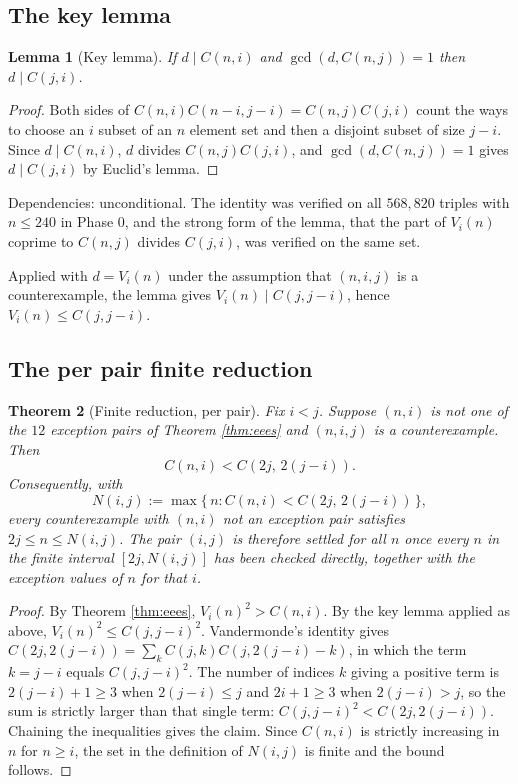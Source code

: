 \documentclass[11pt]{article}
\newtheorem{theorem}{Theorem}[section]
\newtheorem{lemma}[theorem]{Lemma}
\theoremstyle{remark}
\begin{document}
\subsection{The key lemma}

\begin{lemma}[Key lemma]
\label{lem:key}
If $d\mid C(n,i)$ and $\gcd(d,C(n,j))=1$ then $d\mid C(j,i)$.
\end{lemma}

\begin{proof}
Both sides of $C(n,i)C(n-i,j-i)=C(n,j)C(j,i)$ count the ways to choose an $i$ subset of an $n$ element set and then a disjoint subset of size $j-i$. Since $d\mid C(n,i)$, $d$ divides $C(n,j)C(j,i)$, and $\gcd(d,C(n,j))=1$ gives $d\mid C(j,i)$ by Euclid's lemma.
\end{proof}

Dependencies: unconditional. The identity was verified on all $568{,}820$ triples with $n\le 240$ in Phase 0, and the strong form of the lemma, that the part of $V_i(n)$ coprime to $C(n,j)$ divides $C(j,i)$, was verified on the same set.

Applied with $d=V_i(n)$ under the assumption that $(n,i,j)$ is a counterexample, the lemma gives $V_i(n)\mid C(j,j-i)$, hence $V_i(n)\le C(j,j-i)$.

\subsection{The per pair finite reduction}

\begin{theorem}[Finite reduction, per pair]
\label{thm:reduction}
Fix $i<j$. Suppose $(n,i)$ is not one of the $12$ exception pairs of Theorem \ref{thm:eees} and $(n,i,j)$ is a counterexample. Then
\[
C(n,i) < C(2j,\,2(j-i)).
\]
Consequently, with
\[
N(i,j) := \max\{\,n : C(n,i) < C(2j,\,2(j-i))\,\},
\]
every counterexample with $(n,i)$ not an exception pair satisfies $2j\le n\le N(i,j)$. The pair $(i,j)$ is therefore settled for all $n$ once every $n$ in the finite interval $[2j,N(i,j)]$ has been checked directly, together with the exception values of $n$ for that $i$.
\end{theorem}

\begin{proof}
By Theorem \ref{thm:eees}, $V_i(n)^2>C(n,i)$. By the key lemma applied as above, $V_i(n)^2\le C(j,j-i)^2$. Vandermonde's identity gives $C(2j,2(j-i))=\sum_k C(j,k)C(j,2(j-i)-k)$, in which the term $k=j-i$ equals $C(j,j-i)^2$. The number of indices $k$ giving a positive term is $2(j-i)+1\ge 3$ when $2(j-i)\le j$ and $2i+1\ge 3$ when $2(j-i)>j$, so the sum is strictly larger than that single term: $C(j,j-i)^2<C(2j,2(j-i))$. Chaining the inequalities gives the claim. Since $C(n,i)$ is strictly increasing in $n$ for $n\ge i$, the set in the definition of $N(i,j)$ is finite and the bound follows.
\end{proof}
\end{document}
